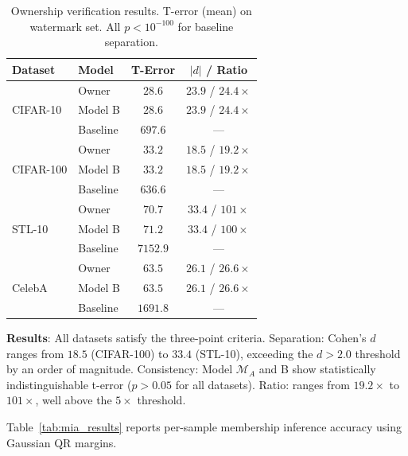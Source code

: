 \documentclass[sigconf, review, anonymous]{acmart}
\begin{document}
\begin{table}[t]
\caption{Ownership verification results. T-error (mean) on watermark set. All $p < 10^{-100}$ for baseline separation.}
\label{tab:main_results}
\begin{center}
\begin{small}
\begin{tabular}{@{}llcc@{}}
\toprule
Dataset & Model & T-Error & $|d|$ / Ratio \\
\midrule
\multirow{3}{*}{CIFAR-10}
& Owner & $28.6$ & $23.9$ / $24.4\times$ \\
& Model B & $28.6$ & $23.9$ / $24.4\times$ \\
& Baseline & $697.6$ & --- \\
\midrule
\multirow{3}{*}{CIFAR-100}
& Owner & $33.2$ & $18.5$ / $19.2\times$ \\
& Model B & $33.2$ & $18.5$ / $19.2\times$ \\
& Baseline & $636.6$ & --- \\
\midrule
\multirow{3}{*}{STL-10}
& Owner & $70.7$ & $33.4$ / $101\times$ \\
& Model B & $71.2$ & $33.4$ / $100\times$ \\
& Baseline & $7152.9$ & --- \\
\midrule
\multirow{3}{*}{CelebA}
& Owner & $63.5$ & $26.1$ / $26.6\times$ \\
& Model B & $63.5$ & $26.1$ / $26.6\times$ \\
& Baseline & $1691.8$ & --- \\
\bottomrule
\end{tabular}
\end{small}
\end{center}
\end{table}

\textbf{Results}: All datasets satisfy the three-point criteria. Separation: Cohen's $d$ ranges from $18.5$ (CIFAR-100) to $33.4$ (STL-10), exceeding the $d > 2.0$ threshold by an order of magnitude. Consistency: Model $\mathcal{M}_A$ and B show statistically indistinguishable t-error ($p > 0.05$ for all datasets). Ratio: ranges from $19.2\times$ to $101\times$, well above the $5\times$ threshold.

Table~\ref{tab:mia_results} reports per-sample membership inference accuracy using Gaussian QR margins.
\end{document}
